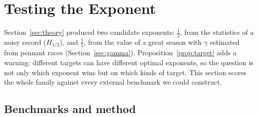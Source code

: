 \documentclass[11pt,letterpaper]{article}
\theoremstyle{plain}
\theoremstyle{definition}
\theoremstyle{remark}
\begin{document}
\section{Testing the Exponent}
\label{sec:convergence}

Section~\ref{sec:theory} produced two candidate exponents: $\tfrac12$, from the statistics of a noisy record ($H_{1/2}$), and $\tfrac15$, from the value of a great season with $\gamma$ estimated from pennant races (Section~\ref{sec:gamma}). Proposition~\ref{prop:target} adds a warning: different targets can have different optimal exponents, so the question is not only which exponent wins but on which kinds of target. This section scores the whole family against every external benchmark we could construct.

\subsection{Benchmarks and method}
\label{sec:benchmarks}
\end{document}
